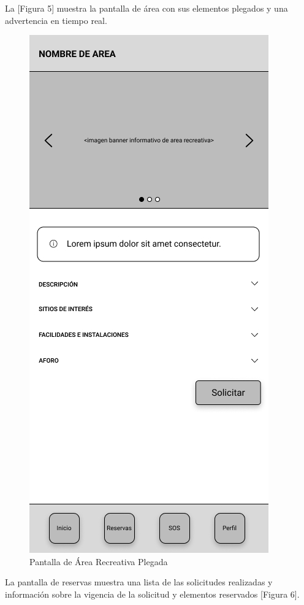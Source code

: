 \documentclass{scrartcl}
\begin{document}
        La [Figura 5] muestra la pantalla de área con sus elementos plegados y una
        advertencia en tiempo real.
        \begin{figure}[H]
            \centerline{\includegraphics[scale=0.20]{wireareamerged}}
            \caption{Pantalla de Área Recreativa Plegada}
            \label{fig:wireáreamerged}
        \end{figure}
        La pantalla de reservas muestra una lista de las solicitudes realizadas y 
        información sobre la vigencia de la solicitud y elementos reservados [Figura 6].
\end{document}
